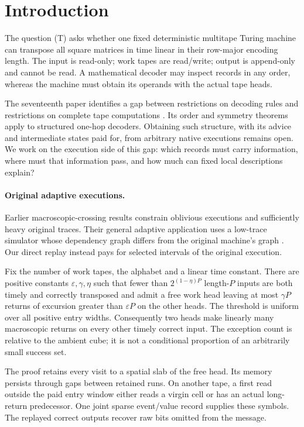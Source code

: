 \section{Introduction}\label{sec:introduction}

The question (T) asks whether one fixed deterministic multitape Turing machine
can transpose all square matrices in time linear in their row-major encoding
length. The input is read-only; work tapes are read/write; output is append-only
and cannot be read. A mathematical decoder may inspect records in any order,
whereas the machine must obtain its operands with the actual tape heads.

The seventeenth paper identifies a gap between restrictions on decoding
rules and restrictions on complete tape computations
\cite[Sections~3 and~7.4]{SeventeenthPaper2026}. Its order and symmetry
theorems apply to structured one-hop decoders. Obtaining such structure,
with its advice and intermediate states paid for, from arbitrary native
executions remains open. We work on the execution side of this gap:
which records must carry information, where must that information pass,
and how much can fixed local descriptions explain?

\paragraph{Original adaptive executions.}
Earlier macroscopic-crossing results constrain oblivious executions and
sufficiently heavy original traces. Their general adaptive application uses
a low-trace simulator whose dependency graph differs from the original
machine's graph \cite{MacroscopicCrossings2026}. Our direct replay instead
pays for selected intervals of the original execution.

Fix the number of work tapes, the alphabet and a linear time constant.
There are positive constants $\varepsilon,\gamma,\eta$ such that fewer than
$2^{(1-\eta)P}$ length-$P$ inputs are both timely and correctly transposed
and admit a free work head leaving at most $\gamma P$ returns of excursion
greater than $\varepsilon P$ on the other heads. The threshold is uniform
over all positive entry widths. Consequently two heads make linearly many
macroscopic returns on every other timely correct input. The exception
count is relative to the ambient cube; it is not a conditional proportion
of an arbitrarily small success set.

The proof retains every visit to a spatial slab of the free head. Its
memory persists through gaps between retained runs. On another tape, a
first read outside the paid entry window either reads a virgin cell or has
an actual long-return predecessor. One joint sparse event/value record
supplies these symbols. The replayed correct outputs recover raw bits
omitted from the message.

